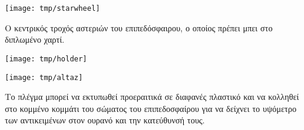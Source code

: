 \documentclass[a4paper,onecolumn,10pt]{article}
\begin{document}
\newpage

\centerline{\texttt{[image: tmp/starwheel]}}

\vspace{1cm}
Ο κεντρικός τροχός αστεριών του επιπεδόσφαιρου, ο οποίος πρέπει μπει στο διπλωμένο χαρτί.

\newpage
\thispagestyle{empty}
\vspace*{-3.0cm}
\centerline{\texttt{[image: tmp/holder]}}
\newpage

\centerline{\texttt{[image: tmp/altaz]}}

\vspace{1cm}
Το πλέγμα μπορεί να εκτυπωθεί προεραιτικά σε διαφανές πλαστικό και να κολληθεί στο κομμένο κομμάτι του σώματος του επιπεδοσφαίρου για να δείχνει το υψόμετρο των αντικειμένων στον ουρανό και την κατεύθυνσή τους.
\end{document}
